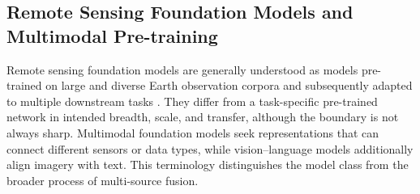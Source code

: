 \documentclass[]{interact}
\theoremstyle{plain}%
\theoremstyle{definition}
\theoremstyle{remark}
\DeclareRobustCommand{\DIFadd}[1]{{\protect\color{DIFaddcolor}\uwave{#1}}}
\def\DIFadd#1{#1}%
\begin{document}
\subsection{\DIFadd{Remote} \DIFadd{Sensing} \DIFadd{Foundation} \DIFadd{Models} \DIFadd{and} \DIFadd{Multimodal} \DIFadd{Pre-training}}

\DIFadd{Remote} \DIFadd{sensing} \DIFadd{foundation} \DIFadd{models} \DIFadd{are} \DIFadd{generally} \DIFadd{understood} \DIFadd{as} \DIFadd{models} \DIFadd{pre-trained} \DIFadd{on} \DIFadd{large} \DIFadd{and} \DIFadd{diverse} \DIFadd{Earth} \DIFadd{observation} \DIFadd{corpora} \DIFadd{and} \DIFadd{subsequently} \DIFadd{adapted} \DIFadd{to} \DIFadd{multiple} \DIFadd{downstream} \DIFadd{tasks} {\color{blue}\citep{cong2022satmae,liu2024remoteclip}}\DIFadd{.} \DIFadd{They} \DIFadd{differ} \DIFadd{from} \DIFadd{a} \DIFadd{task-specific} \DIFadd{pre-trained} \DIFadd{network} \DIFadd{in} \DIFadd{intended} \DIFadd{breadth}\DIFadd{,} \DIFadd{scale}\DIFadd{,} \DIFadd{and} \DIFadd{transfer}\DIFadd{,} \DIFadd{although} \DIFadd{the} \DIFadd{boundary} \DIFadd{is} \DIFadd{not} \DIFadd{always} \DIFadd{sharp}\DIFadd{.} \DIFadd{Multimodal} \DIFadd{foundation} \DIFadd{models} \DIFadd{seek} \DIFadd{representations} \DIFadd{that} \DIFadd{can} \DIFadd{connect} \DIFadd{different} \DIFadd{sensors} \DIFadd{or} \DIFadd{data} \DIFadd{types}\DIFadd{,} \DIFadd{while} \DIFadd{vision--language} \DIFadd{models} \DIFadd{additionally} \DIFadd{align} \DIFadd{imagery} \DIFadd{with} \DIFadd{text}\DIFadd{.} \DIFadd{This} \DIFadd{terminology} \DIFadd{distinguishes} \DIFadd{the} \DIFadd{model} \DIFadd{class} \DIFadd{from} \DIFadd{the} \DIFadd{broader} \DIFadd{process} \DIFadd{of} \DIFadd{multi-source} \DIFadd{fusion}\DIFadd{.}
\end{document}
